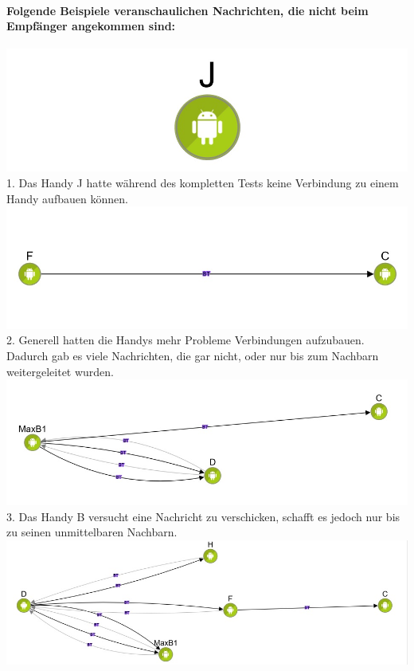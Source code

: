 \paragraph*{Folgende Beispiele veranschaulichen Nachrichten, die nicht beim
Empfänger angekommen sind:}
\includegraphics[width=1.0\textwidth]{belege/grosstests/Bilder/Test2Misserfolg1.jpg}\\ 1. Das
Handy J hatte während des kompletten Tests keine Verbindung zu einem
Handy aufbauen können.\\
\includegraphics[width=1.0\textwidth]{belege/grosstests/Bilder/Test2Misserfolg3.jpg}\\ 2.
Generell hatten die Handys mehr Probleme Verbindungen aufzubauen.
Dadurch gab es viele Nachrichten, die gar nicht, oder nur bis zum
Nachbarn weitergeleitet wurden.\\
\includegraphics[width=1.0\textwidth]{belege/grosstests/Bilder/Test2Misserfolg4.jpg} \\3. Das
Handy B versucht eine Nachricht zu verschicken, schafft es jedoch nur
bis zu seinen unmittelbaren Nachbarn.\\
\includegraphics[width=1.0\textwidth]{belege/grosstests/Bilder/Test2Misserfolg5.jpg}\\
